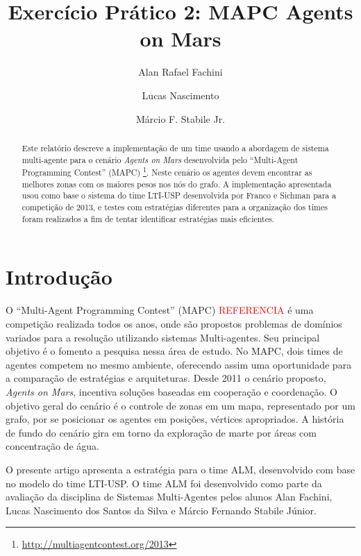 \documentclass{llncs}
\begin{document}
\title{Exercício Prático 2: MAPC Agents on Mars}

\author{Alan Rafael Fachini \and Lucas Nascimento \and Márcio F. Stabile Jr.}

\maketitle

\begin{abstract}
Este relatório descreve a implementação de um time usando a abordagem de sistema multi-agente para o cenário \textit{Agents on Mars} desenvolvida pelo ``Multi-Agent Programming Contest'' (MAPC) \footnote{\url{http://multiagentcontest.org/2013}}. Neste cenário os agentes devem encontrar as melhores zonas com os maiores pesos nos nós do grafo. A implementação apresentada usou como base o sistema do time LTI-USP desenvolvida por Franco e Sichman \cite{franco2013improving} para a competição de 2013, e testes com estratégias diferentes para a organização dos times foram realizados a fim de tentar identificar estratégias mais eficientes.
\end{abstract}

\section{Introdução}

O ``Multi-Agent Programming Contest'' (MAPC) \textcolor{red}{REFERENCIA} é uma competição realizada todos os anos, onde são propostos problemas de domínios variados para a resolução utilizando sistemas Multi-agentes. Seu principal objetivo é o fomento a pesquisa nessa área de estudo. No MAPC, dois times de agentes competem no mesmo ambiente, oferecendo assim uma oportunidade para a comparação de estratégias e arquiteturas. Desde 2011 o cenário proposto, \textit{Agents on Mars}, incentiva soluções baseadas em cooperação e coordenação. O objetivo geral do cenário é o controle de zonas em um mapa, representado por um grafo, por se posicionar os agentes em posições, vértices apropriados. A história de fundo do cenário gira em torno da exploração de marte por áreas com concentração de água.

O presente artigo apresenta a estratégia para o time ALM, desenvolvido com base no modelo do time LTI-USP. O time ALM foi desenvolvido como parte da avaliação da disciplina de Sistemas Multi-Agentes pelos alunos Alan Fachini, Lucas Nascimento dos Santos da Silva e Márcio Fernando Stabile Júnior.
\end{document}

